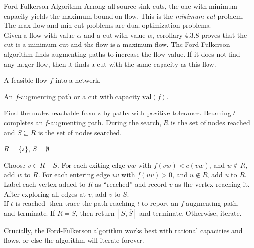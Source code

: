 \documentclass[10pt]{extarticle}
\begin{document}
  \begin{problem}{Ford-Fulkerson Algorithm}
    Among all source-sink cuts, the one with minimum capacity yields the maximum bound on flow. This is the \textit{minimum cut} problem. The max flow and min cut problems are dual optimization problems.\\

    Given a flow with value $\alpha$ and a cut with value $\alpha$, corollary $4.3.8$ proves that the cut is a minimum cut and the flow is a maximum flow. The Ford-Fulkerson algorithm finds augmenting paths to increase the flow value. If it does not find any larger flow, then it finds a cut with the same capacity as this flow.

    \begin{description}[font=\normalfont\scshape]
      \item[Input] A feasible flow $f$ into a network.
      \item[Output] An $f$-augmenting path or a cut with capacity $\textrm{val}(f)$.
      \item[Idea] Find the nodes reachable from $s$ by paths with positive tolerance. Reaching $t$ completes an $f$-augmenting path. During the search, $R$ is the set of nodes reached and $S\subseteq R$ is the set of nodes searched.
      \item[Initialization] $R = \{s\}$, $S = \emptyset$
      \item[Iteration] Choose $v\in R-S$. For each exiting edge $vw$ with $f(vw) < c(vw)$, and $w\notin R$, add $w$ to $R$. For each entering edge $uv$ with $f(uv)>0$, and $u\notin R$, add $u$ to $R$.\\

        Label each vertex added to $R$ as ``reached'' and record $v$ as the vertex reaching it. After exploring all edges at $v$, add $v$ to $S$.\\

        If $t$ is reached, then trace the path reaching $t$ to report an $f$-augmenting path, and terminate. If $R = S$, then return $[S,\overline{S}]$ and terminate. Otherwise, iterate.
    \end{description}
    Crucially, the Ford-Fulkerson algorithm works best with rational capacities and flows, or else the algorithm will iterate forever.
  \end{problem}
\end{document}
